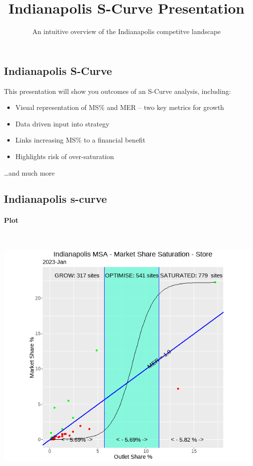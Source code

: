\documentclass[
  letterpaper,
  DIV=11,
  numbers=noendperiod]{scrartcl}
\title{Indianapolis S-Curve Presentation}
\subtitle{An intuitive overview of the Indianapolis competitve
landscape}
\author{}
\date{}
\let\oldparagraph\paragraph
\renewcommand{\paragraph}[1]{\oldparagraph{#1}\mbox{}}
\providecommand{\tightlist}{%
  \setlength{\itemsep}{0pt}\setlength{\parskip}{0pt}}\usepackage{longtable,booktabs,array}
\begin{document}
\maketitle
\ifdefined\Shaded\renewenvironment{Shaded}{\begin{tcolorbox}[borderline west={3pt}{0pt}{shadecolor}, frame hidden, interior hidden, boxrule=0pt, breakable, sharp corners, enhanced]}{\end{tcolorbox}}\fi

\hypertarget{indianapolis-s-curve}{%
\subsection{Indianapolis S-Curve}\label{indianapolis-s-curve}}

This presentation will show you outcomes of an S-Curve analysis,
including:

\begin{itemize}
\tightlist
\item
  Visual representation of MS\% and MER -- two key metrics for growth
\item
  Data driven input into strategy
\item
  Links increasing MS\% to a financial benefit
\item
  Highlights risk of over-saturation
\end{itemize}

\ldots and much more

\hypertarget{indianapolis-s-curve-1}{%
\subsection{Indianapolis s-curve}\label{indianapolis-s-curve-1}}

\hypertarget{plot}{%
\paragraph{Plot}\label{plot}}

\includegraphics[width=5.46875in,height=5.20833in]{images/202301_indy_store.png}
\end{document}
